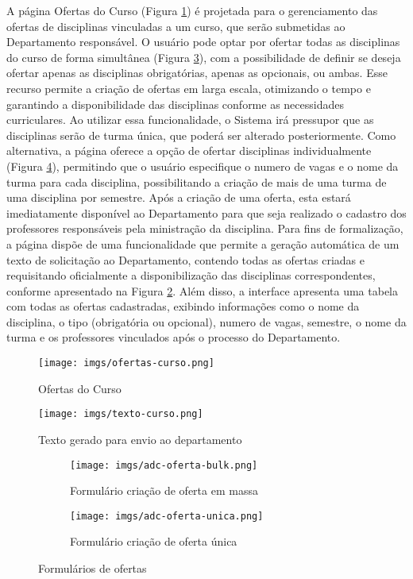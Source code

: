 A página Ofertas do Curso (Figura \ref{fig:oferta:curso}) é projetada para o gerenciamento das ofertas de disciplinas vinculadas a um curso, que serão submetidas ao Departamento responsável. O usuário pode optar por ofertar todas as disciplinas do curso de forma simultânea (Figura \ref{fig:oferta:curso1}), com a possibilidade de definir se deseja ofertar apenas as disciplinas obrigatórias, apenas as opcionais, ou ambas. Esse recurso permite a criação de ofertas em larga escala, otimizando o tempo e garantindo a disponibilidade das disciplinas conforme as necessidades curriculares. Ao utilizar essa funcionalidade, o Sistema irá pressupor que as disciplinas serão de turma única, que poderá ser alterado posteriormente. Como alternativa, a página oferece a opção de ofertar disciplinas individualmente (Figura \ref{fig:oferta:curso2}), permitindo que o usuário especifique o numero de vagas e o nome da turma para cada disciplina, possibilitando a criação de mais de uma turma de uma disciplina por semestre. Após a criação de uma oferta, esta estará imediatamente disponível ao Departamento para que seja realizado o cadastro dos professores responsáveis pela ministração da disciplina. Para fins de formalização, a página dispõe de uma funcionalidade que permite a geração automática de um texto de solicitação ao Departamento, contendo todas as ofertas criadas e requisitando oficialmente a disponibilização das disciplinas correspondentes, conforme apresentado na Figura \ref{fig:text:dpto}. Além disso, a interface apresenta uma tabela com todas as ofertas cadastradas, exibindo informações como o nome da disciplina, o tipo (obrigatória ou opcional), numero de vagas, semestre, o nome da turma e os professores vinculados após o processo do Departamento.


\begin{figure}[h]
    \centering
    \texttt{[image: imgs/ofertas-curso.png]}
    \caption{Ofertas do Curso}
    \label{fig:oferta:curso}
\end{figure}


\begin{figure}[h]
    \centering
    \texttt{[image: imgs/texto-curso.png]}
    \caption{Texto gerado para envio ao departamento}
    \label{fig:text:dpto}
\end{figure}


\begin{figure}[h]
    \centering
     \begin{subfigure}[h]{0.4\textwidth}
        \centering
        \texttt{[image: imgs/adc-oferta-bulk.png]}
        \caption{Formulário criação de oferta em massa}
        \label{fig:oferta:curso1}
    \end{subfigure}
    \begin{subfigure}[h]{0.4\textwidth}
        \centering
        \texttt{[image: imgs/adc-oferta-unica.png]}
        \caption{Formulário criação de oferta única}
        \label{fig:oferta:curso2}
    \end{subfigure}
    \caption{Formulários de ofertas}
    \label{fig:oferta:curso-group}
\end{figure}


